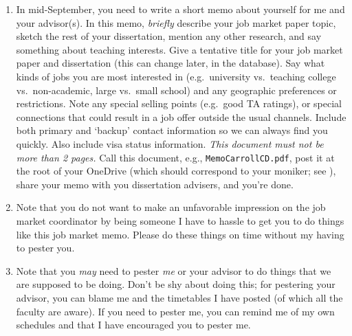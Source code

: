 \documentclass{\classes/econtex}
\begin{document}
\begin{enumerate}
  \hypertarget{write-and-post-memo}{}
\item {} In mid-September, you need to write a short memo about yourself for me and your advisor(s).  In this memo, \textit{briefly} describe your job market paper topic, sketch the rest of your dissertation, mention any other research, and say something about teaching interests.  Give a tentative title for your job market paper and dissertation (this can change later, in the database).  Say what kinds of jobs you are most interested in (e.g.\ university vs.\ teaching college vs.\ non-academic, large vs.\ small school) and any geographic preferences or restrictions.  Note any special selling points (e.g.\ good TA ratings), or special connections that could result in a job offer outside the usual channels.  Include both primary and `backup' contact information so we can always find you quickly.  Also include visa status information.  \textit{This document must not be more than 2 pages.}  Call this document, e.g., \texttt{MemoCarrollCD.pdf}, post it at the root of your OneDrive (which should correspond to your moniker; see \ntn), share your memo with you dissertation advisers, and you're done.  

\item Note that you do not want to make an unfavorable impression on
  the job market coordinator by being someone I have to hassle to get
  you to do things like this job market memo.  Please do these things
  on time without my having to pester you.

  \hypertarget{Pester}{}
\item Note that you \textit{may} need to pester \textit{me} or your advisor to do things
  that we are supposed to be doing.  Don't be shy about doing this; for pestering
  your advisor, you can blame me and the timetables I have posted (of which all the
  faculty are aware).  If you need to pester me, you can remind me of my own
  schedules and that I have encouraged you to pester me.


\end{enumerate}
\end{document}
